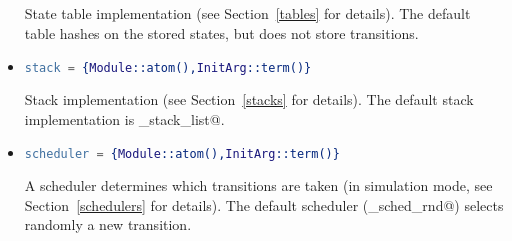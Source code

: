 \documentclass[a4paper]{article}
\begin{document}
\begin{itemize}
State table implementation (see Section~\ref{tables} for details).
The default table hashes on the stored states, but
does not store transitions.
\item
\begin{lstlisting}[language=Erlang]
stack = {Module::atom(),InitArg::term()}
\end{lstlisting}
Stack implementation (see Section~\ref{stacks} for details).
The default stack implementation is \lstinline@mce_stack_list@.
\item
\begin{lstlisting}[language=Erlang]
scheduler = {Module::atom(),InitArg::term()}
\end{lstlisting}
A scheduler determines which transitions are taken (in simulation
mode, see Section~\ref{schedulers} for details).
The default scheduler (\lstinline@mce_sched_rnd@)
selects randomly a new transition.
\end{itemize}
\end{document}
